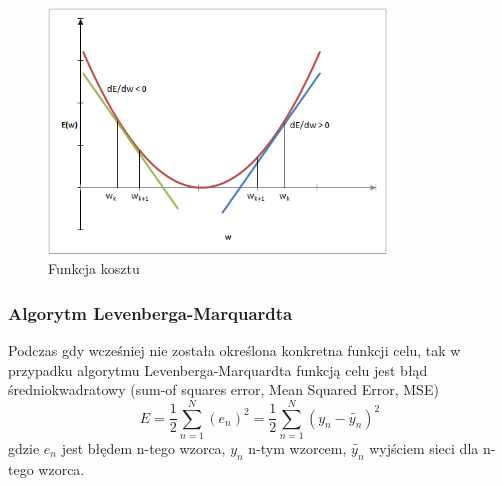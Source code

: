 \begin{figure}
	\centering
	\includegraphics[width=0.8\textwidth]{images/gradient.png}
	\caption{Funkcja kosztu}
	\label{fig:gradient}
\end{figure}

\subsubsection*{Algorytm Levenberga-Marquardta}
Podczas gdy wcześniej nie została określona konkretna funkcji celu, tak w przypadku algorytmu Levenberga-Marquardta funkcją celu jest błąd średniokwadratowy (sum-of squares error, Mean Squared Error, MSE)\cite{Bishop}
\begin{equation}
	\label{wzor:mse}
	E = \frac{1}{2} \sum_{n=1}^N(e_n)^2 = \frac{1}{2} \sum_{n=1}^N(y_n - \tilde{y_n})^2
\end{equation}
gdzie $e_n$ jest błędem n-tego wzorca, $y_n$ n-tym wzorcem, $\tilde{y_n}$ wyjściem sieci dla n-tego wzorca.


